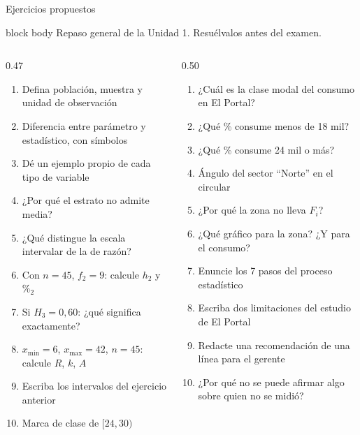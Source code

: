 \documentclass[aspectratio=169,10pt]{beamer}
\begin{document}
\begin{frame}{Ejercicios propuestos}
  \vspace{-0.1cm}
  \begin{beamercolorbox}[wd=\textwidth,sep=0.10cm]{block body}
    \centering\scriptsize
    Repaso general de la Unidad 1. Resuélvalos antes del examen.
  \end{beamercolorbox}
  \tiny
  \begin{columns}[T,onlytextwidth]
    \begin{column}{0.47\textwidth}
      \begin{enumerate}\setlength{\itemsep}{0.16cm}
        \item Defina población, muestra y unidad de observación
        \item Diferencia entre parámetro y estadístico, con símbolos
        \item Dé un ejemplo propio de cada tipo de variable
        \item ¿Por qué el estrato no admite media?
        \item ¿Qué distingue la escala intervalar de la de razón?
        \item Con $n=45$, $f_2=9$: calcule $h_2$ y $\%_2$
        \item Si $H_3=0{,}60$: ¿qué significa exactamente?
        \item $x_{\min}=6$, $x_{\max}=42$, $n=45$: calcule $R$, $k$, $A$
        \item Escriba los intervalos del ejercicio anterior
        \item Marca de clase de $[24,30)$
      \end{enumerate}
    \end{column}
    \begin{column}{0.50\textwidth}
      \begin{enumerate}\setlength{\itemsep}{0.16cm}
        \setcounter{enumi}{10}
        \item ¿Cuál es la clase modal del consumo en El Portal?
        \item ¿Qué \% consume menos de 18 mil?
        \item ¿Qué \% consume 24 mil o más?
        \item Ángulo del sector ``Norte'' en el circular
        \item ¿Por qué la zona no lleva $F_i$?
        \item ¿Qué gráfico para la zona? ¿Y para el consumo?
        \item Enuncie los 7 pasos del proceso estadístico
        \item Escriba dos limitaciones del estudio de El Portal
        \item Redacte una recomendación de una línea para el gerente
        \item ¿Por qué no se puede afirmar algo sobre quien no se midió?
      \end{enumerate}
    \end{column}
  \end{columns}
\end{frame}
\end{document}
